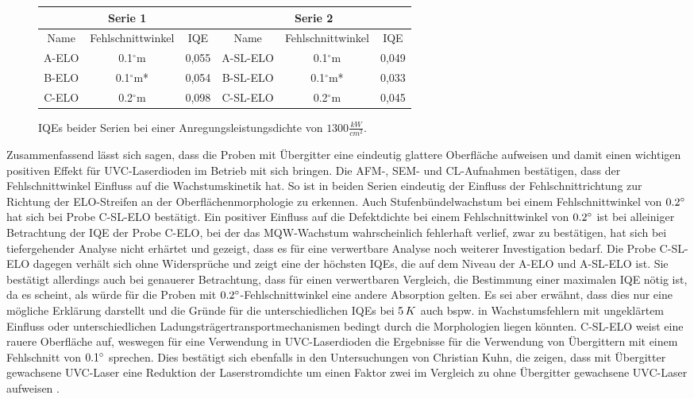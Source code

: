 \begin{figure}[H]
\centering
\begin{tabular}{ |c|c|c|c|c|c|   }
\hline
\multicolumn{3}{|c|}{Serie 1} & \multicolumn{3}{c|}{Serie 2}  \\
\hline
Name & Fehlschnittwinkel & IQE & Name & Fehlschnittwinkel & IQE \\
\hline
A-ELO & 0.1$^\circ$m & 0,055 & A-SL-ELO & 0.1$^\circ$m & 0,049  \\
B-ELO & 0.1$^\circ$m*& 0,054& B-SL-ELO & 0.1$^\circ$m* & 0,033 \\
C-ELO & 0.2$^\circ$m & 0,098& C-SL-ELO & 0.2$^\circ$m & 0,045 \\
\hline
\end{tabular}
\caption{IQEs beider Serien bei einer Anregungsleistungsdichte von $ 1300 \frac{kW}{cm^2} $.}
\end{figure}
\noindent 
Zusammenfassend lässt sich sagen, dass die Proben mit Übergitter eine eindeutig glattere Oberfläche aufweisen und damit einen wichtigen positiven Effekt für UVC-Laserdioden im Betrieb mit sich bringen. Die AFM-, SEM- und CL-Aufnahmen bestätigen, dass der Fehlschnittwinkel Einfluss auf die Wachstumskinetik hat. 
\noindent 
So ist in beiden Serien eindeutig der Einfluss der Fehlschnittrichtung zur Richtung der ELO-Streifen an der Oberflächenmorphologie zu erkennen. Auch Stufenbündelwachstum bei einem Fehlschnittwinkel von $0.2\degree$ hat sich bei Probe C-SL-ELO bestätigt. Ein positiver Einfluss auf die Defektdichte bei einem Fehlschnittwinkel von $0.2 \degree$ ist bei alleiniger Betrachtung der IQE der Probe C-ELO, bei der das MQW-Wachstum wahrscheinlich fehlerhaft verlief, zwar zu bestätigen, hat sich bei tiefergehender Analyse nicht erhärtet und gezeigt, dass es für eine verwertbare Analyse noch weiterer Investigation bedarf. 
\noindent 
Die Probe C-SL-ELO dagegen verhält sich ohne Widersprüche und zeigt eine der höchsten IQEs, die auf dem Niveau der A-ELO und A-SL-ELO ist. Sie bestätigt allerdings auch bei genauerer Betrachtung, dass für einen verwertbaren Vergleich, die Bestimmung einer maximalen IQE nötig ist, da es scheint, als würde für die Proben mit $0.2\degree$-Fehlschnittwinkel eine andere Absorption gelten. Es sei aber erwähnt, dass dies nur eine mögliche Erklärung darstellt und die Gründe für die unterschiedlichen IQEs bei $5\thinspace K$ auch bspw. in Wachstumsfehlern mit ungeklärtem Einfluss oder unterschiedlichen Ladungsträgertransportmechanismen bedingt durch die Morphologien liegen könnten.
\noindent 
C-SL-ELO weist eine rauere Oberfläche auf, weswegen für eine Verwendung in UVC-Laserdioden die Ergebnisse für die Verwendung von Übergittern mit einem Fehlschnitt von $0.1\degree$ sprechen.
Dies bestätigt sich ebenfalls in den Untersuchungen von Christian Kuhn, die zeigen, dass mit Übergitter gewachsene UVC-Laser eine Reduktion der Laserstromdichte um einen Faktor zwei im Vergleich zu ohne Übergitter gewachsene UVC-Laser aufweisen \cite{doi:10.1002/pssa.201870032}.